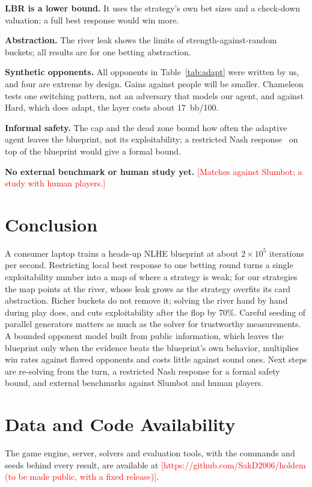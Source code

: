 \documentclass{ieeeaccess}
\newcommand{\pending}[1]{\textcolor{red}{[#1]}}
\newcommand{\bbh}{bb/100}
\begin{document}
\textbf{LBR is a lower bound.} It uses the strategy's own bet sizes and a check-down valuation;
a full best response would win more.

\textbf{Abstraction.} The river leak shows the limits of strength-against-random buckets; all
results are for one betting abstraction.

\textbf{Synthetic opponents.} All opponents in Table~\ref{tab:adapt} were written by us, and four
are extreme by design. Gains against people will be smaller. Chameleon tests one switching
pattern, not an adversary that models our agent, and against Hard, which does adapt, the layer
costs about 17~\bbh.

\textbf{Informal safety.} The cap and the dead zone bound how often the adaptive agent leaves
the blueprint, not its exploitability; a restricted Nash response~\cite{johanson2008} on top of the blueprint would give
a formal bound.

\textbf{No external benchmark or human study yet.} \pending{Matches against Slumbot; a study with
human players.}

\section{Conclusion}
\label{sec:conclusion}
A consumer laptop trains a heads-up NLHE blueprint at about $2\times10^5$ iterations per second.
Restricting local best response to one betting round turns a single exploitability number into a
map of where a strategy is weak; for our strategies the map points at the river, whose leak grows
as the strategy overfits its card abstraction. Richer buckets do not remove it; solving the river
hand by hand during play does, and cuts exploitability after the flop by 70\%. Careful seeding of parallel generators matters as
much as the solver for trustworthy measurements. A bounded opponent model built from public
information, which leaves the blueprint only when the evidence beats the blueprint's own
behavior, multiplies win rates against flawed opponents and costs little against sound ones. Next
steps are re-solving from the turn, a restricted Nash response for a formal safety bound, and
external benchmarks against Slumbot and human players.

\section*{Data and Code Availability}
The game engine, server, solvers and evaluation tools, with the commands and seeds behind every
result, are available at \pending{https://github.com/SakD2006/holdem (to be made public, with a
fixed release)}.
\end{document}
